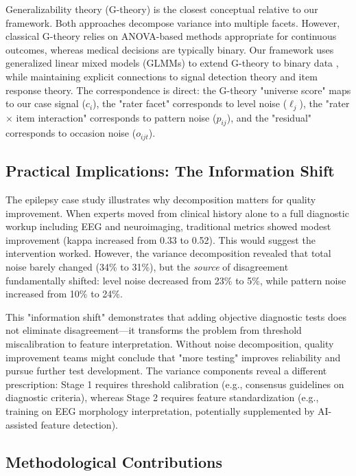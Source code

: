Generalizability theory (G-theory) \cite{Cronbach1972,Brennan2001,Shavelson1991} is the closest conceptual relative to our framework. Both approaches decompose variance into multiple facets. However, classical G-theory relies on ANOVA-based methods appropriate for continuous outcomes, whereas medical decisions are typically binary. Our framework uses generalized linear mixed models (GLMMs) to extend G-theory to binary data \cite{Jiang2018}, while maintaining explicit connections to signal detection theory and item response theory. The correspondence is direct: the G-theory "universe score" maps to our case signal ($c_i$), the "rater facet" corresponds to level noise ($\ell_j$), the "rater $\times$ item interaction" corresponds to pattern noise ($p_{ij}$), and the "residual" corresponds to occasion noise ($o_{ijt}$).

\subsection*{Practical Implications: The Information Shift}

The epilepsy case study illustrates why decomposition matters for quality improvement. When experts moved from clinical history alone to a full diagnostic workup including EEG and neuroimaging, traditional metrics showed modest improvement (kappa increased from 0.33 to 0.52). This would suggest the intervention worked. However, the variance decomposition revealed that total noise barely changed (34\% to 31\%), but the \textit{source} of disagreement fundamentally shifted: level noise decreased from 23\% to 5\%, while pattern noise increased from 10\% to 24\%.

This "information shift" demonstrates that adding objective diagnostic tests does not eliminate disagreement---it transforms the problem from threshold miscalibration to feature interpretation. Without noise decomposition, quality improvement teams might conclude that "more testing" improves reliability and pursue further test development. The variance components reveal a different prescription: Stage 1 requires threshold calibration (e.g., consensus guidelines on diagnostic criteria), whereas Stage 2 requires feature standardization (e.g., training on EEG morphology interpretation, potentially supplemented by AI-assisted feature detection).

\subsection*{Methodological Contributions}

